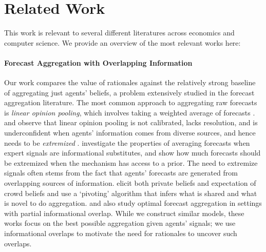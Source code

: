 \section{Related Work}
This work is relevant to several different literatures across economics and computer science. We provide an overview of the most relevant works here:

\paragraph{Forecast Aggregation with Overlapping Information} Our work compares the value of rationales against the relatively strong baseline of aggregating just agents' beliefs, a problem extensively studied in the forecast aggregation literature. The most common approach to aggregating raw forecasts is \emph{linear opinion pooling}, which involves taking a weighted average of forecasts \citep{armstrong2001combining}. \citet{ranjan2010combining} and \citet{satopaa2014combining} observe that linear opinion pooling is not calibrated, lacks resolution, and is underconfident when agents' information comes from diverse sources, and hence needs to be \emph{extremized} \citep{satopaa2015combining}.  \citet{Neyman2021AreYS} investigate the properties of averaging forecasts when expert signals are informational substitutes, and show how much forecasts should be extremized when the mechanism has access to a prior.
The need to extremize signals often stems from the fact that agents' forecasts are generated from overlapping sources of information. \citet{palley2019extracting} elicit both private beliefs and expectation of crowd beliefs and use a `pivoting' algorithm that infers what is shared and what is novel to do aggregation. \citet{satopaa2016modeling,satopaa2017partial} and \citet{babichenko2021learning} also study optimal forecast aggregation in settings with partial informational overlap. While we construct similar models, these works focus on the best possible aggregation given agents' signals; we use informational overlaps to motivate the need for rationales to uncover such overlaps.

